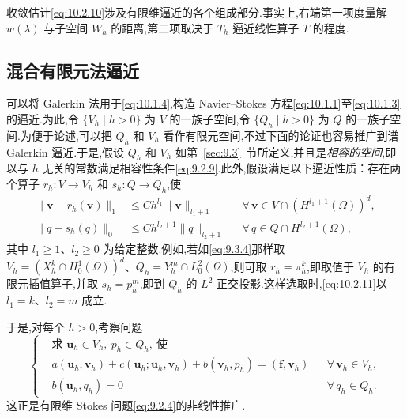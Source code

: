 收敛估计\eqref{eq:10.2.10}涉及有限维逼近的各个组成部分.事实上,右端第一项度量解 \(w(\lambda)\) 与子空间 \(W_h\) 的距离,第二项取决于 \(T_h\) 逼近线性算子 \(T\) 的程度.

\subsection{混合有限元法逼近}\label{sec:10.2.2}

可以将 Galerkin 法用于\eqref{eq:10.1.4},构造 Navier--Stokes 方程\eqref{eq:10.1.1}至\eqref{eq:10.1.3}的逼近.为此,令 \(\{V_h\mid h>0\}\) 为 \(V\) 的一族子空间,令 \(\{Q_h\mid h>0\}\) 为 \(Q\) 的一族子空间.为便于论述,可以把 \(Q_h\) 和 \(V_h\) 看作有限元空间,不过下面的论证也容易推广到谱 Galerkin 逼近.于是,假设 \(Q_h\) 和 \(V_h\) 如第~\ref{sec:9.3}~节所定义,并且是\emph{相容的空间},即以与 \(h\) 无关的常数满足相容性条件\eqref{eq:9.2.9}.此外,假设满足以下逼近性质：存在两个算子 \(r_h\colon V\to V_h\) 和 \(s_h\colon Q\to Q_h\),使
\begin{equation}\label{eq:10.2.11}
  \begin{aligned}
    \|\boldsymbol{v}-r_h(\boldsymbol{v})\|_1
       &\le Ch^{l_1}\|\boldsymbol{v}\|_{l_1+1}
       &&\forall\,\boldsymbol{v}\in V\cap(H^{l_1+1}(\Omega))^d,\\
    \|q-s_h(q)\|_0&\le Ch^{l_2+1}\|q\|_{l_2+1}
       &&\forall\,q\in Q\cap H^{l_2+1}(\Omega),
  \end{aligned}
\end{equation}
其中 \(l_1\ge1\)、\(l_2\ge0\) 为给定整数.例如,若如\eqref{eq:9.3.4}那样取 \(V_h=(X_h^k\cap H_0^1(\Omega))^d\)、\(Q_h=Y_h^m\cap L_0^2(\Omega)\),则可取 \(r_h=\pi_h^k\),即取值于 \(V_h\) 的有限元插值算子,并取 \(s_h=p_h^m\),即到 \(Q_h\) 的 \(L^2\) 正交投影.这样选取时,\eqref{eq:10.2.11}以 \(l_1=k\)、\(l_2=m\) 成立.

于是,对每个 \(h>0\),考察问题
\begin{equation}\label{eq:10.2.12}
  \left\{
  \begin{aligned}
    &\text{求 }\boldsymbol{u}_h\in V_h,\ p_h\in Q_h,\ \text{使}\\
    &a(\boldsymbol{u}_h,\boldsymbol{v}_h)+c(\boldsymbol{u}_h;\boldsymbol{u}_h,\boldsymbol{v}_h)
         +b(\boldsymbol{v}_h,p_h)=(\boldsymbol{f},\boldsymbol{v}_h)&&\forall\,\boldsymbol{v}_h\in V_h,\\
    &b(\boldsymbol{u}_h,q_h)=0&&\forall\,q_h\in Q_h .
  \end{aligned}
  \right.
\end{equation}
这正是有限维 Stokes 问题\eqref{eq:9.2.4}的非线性推广.

